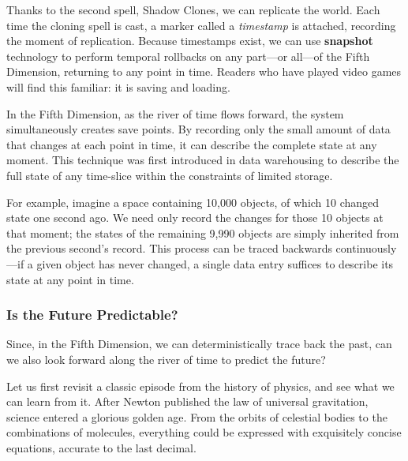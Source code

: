 \vspace{0.8em}

Thanks to the second spell, Shadow Clones, we can replicate the world. Each time the cloning spell is cast, a marker called a \textit{timestamp} is attached, recording the moment of replication. Because timestamps exist, we can use \textbf{snapshot} technology to perform temporal rollbacks on any part---or all---of the Fifth Dimension, returning to any point in time. Readers who have played video games will find this familiar: it is saving and loading.

\vspace{0.8em}

In the Fifth Dimension, as the river of time flows forward, the system simultaneously creates save points. By recording only the small amount of data that changes at each point in time, it can describe the complete state at any moment. This technique was first introduced in data warehousing to describe the full state of any time-slice within the constraints of limited storage.

\vspace{0.8em}

For example, imagine a space containing 10,000 objects, of which 10 changed state one second ago. We need only record the changes for those 10 objects at that moment; the states of the remaining 9,990 objects are simply inherited from the previous second's record. This process can be traced backwards continuously---if a given object has never changed, a single data entry suffices to describe its state at any point in time.

\newpage
\subsubsection{Is the Future Predictable?}
Since, in the Fifth Dimension, we can deterministically trace back the past, can we also look forward along the river of time to predict the future?

\vspace{1em}

Let us first revisit a classic episode from the history of physics, and see what we can learn from it.
After Newton published the law of universal gravitation, science entered a glorious golden age. From the orbits of celestial bodies to the combinations of molecules, everything could be expressed with exquisitely concise equations, accurate to the last decimal.

\vspace{1em}

